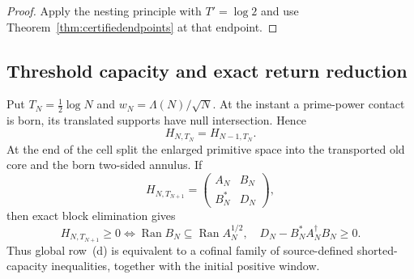 \documentclass[11pt]{amsart}
\theoremstyle{definition}
\theoremstyle{remark}
\begin{document}
\begin{proof}
Apply the nesting principle with \(T'=\log2\) and use
Theorem~\ref{thm:certifiedendpoints} at that endpoint.
\end{proof}

\subsection{Threshold capacity and exact return reduction}
\label{subsec:thresholdcapacity}

Put \(T_N=\frac12\log N\) and
\(w_N=\Lambda(N)/\sqrt N\).  At the instant a prime-power contact is born,
its translated supports have null intersection.  Hence
\begin{equation}\label{eq:thresholdbirth}
 H_{N,T_N}=H_{N-1,T_N}.
\end{equation}
At the end of the cell split the enlarged primitive space into the
transported old core and the born two-sided annulus.  If
\[
 H_{N,T_{N+1}}=\begin{pmatrix}A_N&B_N\\B_N^*&D_N\end{pmatrix},
\]
then exact block elimination gives
\begin{equation}\label{eq:thresholdcapacity}
 H_{N,T_{N+1}}\ge0
 \Longleftrightarrow
 \operatorname{Ran}B_N\subseteq\operatorname{Ran}A_N^{1/2},
 \quad D_N-B_N^*A_N^\dagger B_N\ge0.
\end{equation}
Thus global row~(d) is equivalent to a cofinal family of source-defined
shorted-capacity inequalities, together with the initial positive window.
\end{document}
